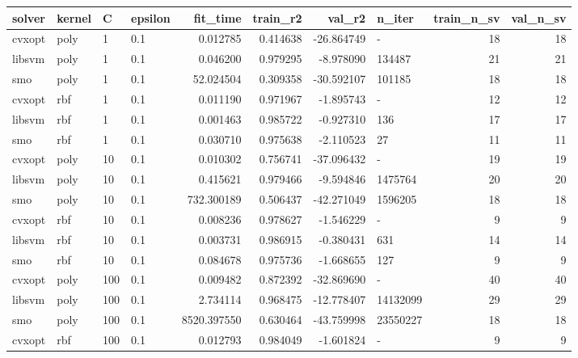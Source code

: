 \begin{tabular}{llllrrrlrr}
\toprule
solver & kernel &   C & epsilon &    fit\_time &   train\_r2 &     val\_r2 &   n\_iter &  train\_n\_sv &  val\_n\_sv \\
\midrule
cvxopt &   poly &   1 &     0.1 &    0.012785 &   0.414638 & -26.864749 &        - &          18 &        18 \\
libsvm &   poly &   1 &     0.1 &    0.046200 &   0.979295 &  -8.978090 &   134487 &          21 &        21 \\
   smo &   poly &   1 &     0.1 &   52.024504 &   0.309358 & -30.592107 &   101185 &          18 &        18 \\
cvxopt &    rbf &   1 &     0.1 &    0.011190 &   0.971967 &  -1.895743 &        - &          12 &        12 \\
libsvm &    rbf &   1 &     0.1 &    0.001463 &   0.985722 &  -0.927310 &      136 &          17 &        17 \\
   smo &    rbf &   1 &     0.1 &    0.030710 &   0.975638 &  -2.110523 &       27 &          11 &        11 \\
cvxopt &   poly &  10 &     0.1 &    0.010302 &   0.756741 & -37.096432 &        - &          19 &        19 \\
libsvm &   poly &  10 &     0.1 &    0.415621 &   0.979466 &  -9.594846 &  1475764 &          20 &        20 \\
   smo &   poly &  10 &     0.1 &  732.300189 &   0.506437 & -42.271049 &  1596205 &          18 &        18 \\
cvxopt &    rbf &  10 &     0.1 &    0.008236 &   0.978627 &  -1.546229 &        - &           9 &         9 \\
libsvm &    rbf &  10 &     0.1 &    0.003731 &   0.986915 &  -0.380431 &      631 &          14 &        14 \\
   smo &    rbf &  10 &     0.1 &    0.084678 &   0.975736 &  -1.668655 &      127 &           9 &         9 \\
cvxopt &   poly & 100 &     0.1 &    0.009482 &   0.872392 & -32.869690 &        - &          40 &        40 \\
libsvm &   poly & 100 &     0.1 &    2.734114 &   0.968475 & -12.778407 & 14132099 &          29 &        29 \\
   smo &   poly & 100 &     0.1 & 8520.397550 &   0.630464 & -43.759998 & 23550227 &          18 &        18 \\
cvxopt &    rbf & 100 &     0.1 &    0.012793 &   0.984049 &  -1.601824 &        - &           9 &         9 \\

\end{tabular}
